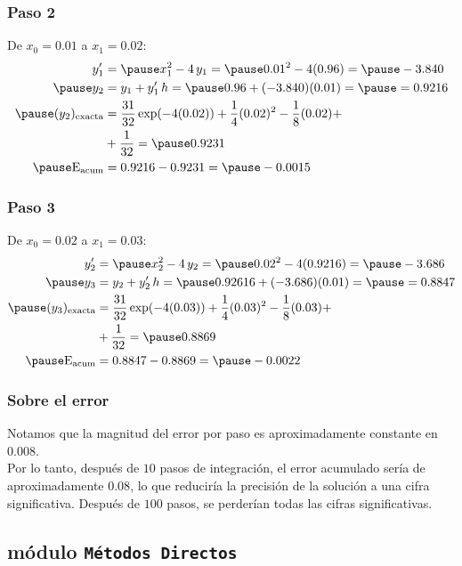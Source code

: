 \documentclass[12pt]{beamer}
\begin{document}
\begin{frame}
\frametitle{Paso 2}
De $x_{0} = 0.01$ a $x_{1} = 0.02$:
\pause
\begin{eqnarray*}
\begin{aligned}
\pderivada{y}_{1} &= \pause x_{1}^{2} - 4 \, y_{1} = \pause 0.01^{2} - 4 (0.96) = \pause - 3.840 \\ \pause
y_{2} &= y_{1} + \pderivada{y}_{1} \, h = \pause 0.96 + (- 3.840)(0.01) = \pause = 0.9216 \\ \pause
(y_{2})_{\text{exacta}} &= \dfrac{31}{32} \exp(-4 (0.02)) + \dfrac{1}{4} (0.02)^{2} - \dfrac{1}{8} (0.02) +  \\
&+ \dfrac{1}{32} = \pause 0.9231 \\ \pause
\text{E}_{\text{acum}} &= 0.9216 - 0.9231 = \pause -0.0015
\end{aligned}
\end{eqnarray*}
\end{frame}
\begin{frame}
\frametitle{Paso 3}
De $x_{0} = 0.02$ a $x_{1} = 0.03$:
\pause
\begin{eqnarray*}
\begin{aligned}
\pderivada{y}_{2} &= \pause x_{2}^{2} - 4 \, y_{2} = \pause 0.02^{2} - 4 (0.9216) = \pause - 3.686 \\ \pause
y_{3} &= y_{2} + \pderivada{y}_{2} \, h = \pause 0.92616 + (- 3.686)(0.01) = \pause = 0.8847 \\ \pause
(y_{3})_{\text{exacta}} &= \dfrac{31}{32} \exp(-4 (0.03)) + \dfrac{1}{4} (0.03)^{2} - \dfrac{1}{8} (0.03) +  \\
&+ \dfrac{1}{32} = \pause 0.8869 \\ \pause
\text{E}_{\text{acum}} &= 0.8847 - 0.8869 = \pause -0.0022
\end{aligned}
\end{eqnarray*}
\end{frame}
\begin{frame}
\frametitle{Sobre el error}
Notamos que la magnitud del error por paso es aproximadamente constante en $0.008$.
\\
\bigskip
\pause
Por lo tanto, después de $10$ pasos de integración, el error acumulado sería de aproximadamente $0.08$, lo que reduciría la precisión de la solución a una cifra significativa. \pause Después de $100$ pasos, se perderían todas las cifras significativas.
\end{frame}


\subsection{módulo \texttt{Métodos Directos}}
\end{document}
